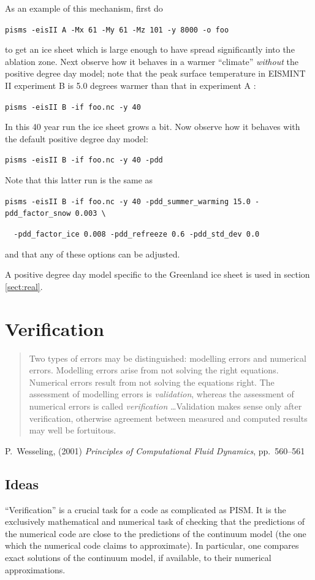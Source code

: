 \documentclass[11pt,final]{amsart}
\begin{document}
As an example of this mechanism, first do

\verb|pisms -eisII A -Mx 61 -My 61 -Mz 101 -y 8000 -o foo|

\noindent to get an ice sheet which is large enough to have spread significantly into the ablation zone.  Next observe how it behaves in a warmer ``climate'' \emph{without} the positive degree day model; note that the peak surface temperature in EISMINT II experiment B is 5.0 degrees warmer than that in experiment A \cite{EISMINT00}:

\verb|pisms -eisII B -if foo.nc -y 40|

\noindent In this 40 year run the ice sheet grows a bit.  Now observe how it behaves with the default positive degree day model:

\verb|pisms -eisII B -if foo.nc -y 40 -pdd|

\noindent Note that this latter run is the same as

\verb|pisms -eisII B -if foo.nc -y 40 -pdd_summer_warming 15.0 -pdd_factor_snow 0.003 \|

\verb|  -pdd_factor_ice 0.008 -pdd_refreeze 0.6 -pdd_std_dev 0.0|

\noindent and that any of these options can be adjusted.

A positive degree day model specific to the Greenland ice sheet is used in section \ref{sect:real}.



\clearpage\newpage
\section{Verification}\label{sect:verif}

\bigskip
\begin{quote}  Two types of errors may be distinguished: modelling errors and numerical errors.  Modelling errors arise from not solving the right equations.  Numerical errors result from not solving the equations right.  The assessment of modelling errors is \emph{validation}, whereas the assessment of numerical errors is called \emph{verification} \dots  Validation makes sense only after verification, otherwise agreement between measured and computed results may well be fortuitous.
\end{quote}
\hfill P.~Wesseling, (2001)  \emph{Principles of Computational Fluid Dynamics}, pp.~560--561 \cite{Wesseling}
\bigskip

\subsection{Ideas} ``Verification'' is a crucial task for a code as complicated as PISM.  It is the exclusively mathematical and numerical task of checking that the predictions of the numerical code are close to the predictions of the continuum model (the one which the numerical code claims to approximate).  In particular, one compares exact solutions of the continuum model, if available, to their numerical approximations.
\end{document}
